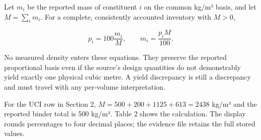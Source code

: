 \documentclass[
  american,
  11pt,
  letterpaper,
]{article}
\begin{document}
Let \(m_i\) be the reported mass of constituent \(i\) on the common
kg/m³ basis, and let \(M=\sum_i m_i\). For a complete, consistently
accounted inventory with \(M>0\),

\[p_i=100\frac{m_i}{M},\qquad m_i=\frac{p_iM}{100}. \tag{1}\]

No measured density enters these equations. They preserve the reported
proportional basis even if the source's design quantities do not
demonstrably yield exactly one physical cubic metre. A yield discrepancy
is still a discrepancy and must travel with any per-volume
interpretation.

For the UCI row in Section 2, \(M=500+200+1125+613=2438\) kg/m³ and the
reported binder total is 500 kg/m³. Table 2 shows the calculation. The
display rounds percentages to four decimal places; the evidence file
retains the full stored values.
\end{document}
